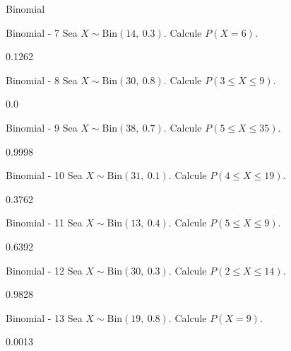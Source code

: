 \documentclass[a4,11pt]{aleph-notas}
\newcommand{\Bin}{\text{Bin}}
\begin{document}
\begin{quiz}{Binomial}
\begin{numerical}[tolerance=0.001]%
    {Binomial - 7}
    Sea \( X \sim \Bin(14,\ 0.3) \). Calcule \( P(X = 6) \).
    \item[] 0.1262
\end{numerical}

\begin{numerical}[tolerance=0.001]%
    {Binomial - 8}
    Sea \( X \sim \Bin(30,\ 0.8) \). Calcule \( P(3 \leq X \leq 9) \).
    \item[] 0.0
\end{numerical}

\begin{numerical}[tolerance=0.001]%
    {Binomial - 9}
    Sea \( X \sim \Bin(38,\ 0.7) \). Calcule \( P(5 \leq X \leq 35) \).
    \item[] 0.9998
\end{numerical}

\begin{numerical}[tolerance=0.001]%
    {Binomial - 10}
    Sea \( X \sim \Bin(31,\ 0.1) \). Calcule \( P(4 \leq X \leq 19) \).
    \item[] 0.3762
\end{numerical}

\begin{numerical}[tolerance=0.001]%
    {Binomial - 11}
    Sea \( X \sim \Bin(13,\ 0.4) \). Calcule \( P(5 \leq X \leq 9) \).
    \item[] 0.6392
\end{numerical}

\begin{numerical}[tolerance=0.001]%
    {Binomial - 12}
    Sea \( X \sim \Bin(30,\ 0.3) \). Calcule \( P(2 \leq X \leq 14) \).
    \item[] 0.9828
\end{numerical}

\begin{numerical}[tolerance=0.001]%
    {Binomial - 13}
    Sea \( X \sim \Bin(19,\ 0.8) \). Calcule \( P(X = 9) \).
    \item[] 0.0013
\end{numerical}


\end{quiz}
\end{document}
